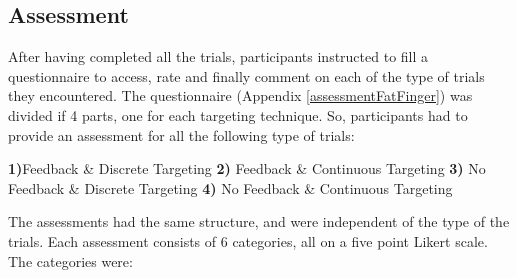 \subsection{Assessment}
\label{assessment}


After having completed all the trials, participants instructed to fill a questionnaire to access, rate and finally comment on each of the type of trials they encountered. The questionnaire (Appendix \ref{assessmentFatFinger}) was divided if 4 parts, one for each targeting technique. So, participants had to provide an assessment for all the following type of trials:

 \textbf{1)}Feedback \& Discrete Targeting \textbf{2)} Feedback \& Continuous Targeting \textbf{3)} No Feedback \& Discrete Targeting \textbf{4)} No Feedback \& Continuous Targeting


The assessments had the same structure, and were independent of the type of the trials. Each assessment consists of 6 categories, all on a five point Likert scale. The categories were:


